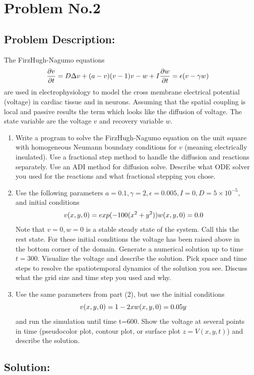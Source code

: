 \section{Problem No.2} \label{sec:prob2}
\subsection{Problem Description:} 
The FirzHugh-Nagumo equations 
$$
\frac{\partial v}{\partial t} = D\Delta v + (a-v)(v-1)v - w+I
\\
\frac{\partial w}{\partial t} = \epsilon (v-\gamma w)
$$
are used in electrophysiology to model the cross membrane electrical potential (voltage) in cardiac tissue and in neurons. Assuming that the spatial coupling is local and passive results the term which looks like the diffusion of voltage. The state variable are the voltage $v$ and recovery variable $w$.
\begin{enumerate}
\item Write a program to solve the FirzHugh-Nagumo equation on the unit square with homogeneous Neumann boundary conditions for $v$ (meaning electrically insulated). Use a fractional step method to handle the diffusion and reactions separately. Use an ADI method for diffusion solve. Describe what ODE solver you used for the reactions and what fractional stepping you chose. 
\item Use the following parameters $a=0.1, \gamma =2, \epsilon=0.005, I=0, D=5\times 10^{-5}$, and initial conditions 
$$
v(x,y,0)=exp(-100(x^{2}+y^{2}))
\\
w(x,y,0)=0.0
$$
Note that $v=0, w=0$ is a stable steady state of the system. Call this the rest state. For these initial conditions the voltage has been raised above in the bottom corner of the domain. Generate a numerical solution up to time $t=300$. Visualize the voltage and describe the solution. Pick space and time steps to resolve the spatiotemporal dynamics of the solution you see. Discuss what the grid size and time step you used and why. 
\item Use the same parameters from part (2), but use the initial conditions 
$$
v(x,y,0) = 1-2x
\\
w(x,y,0) = 0.05y
$$
and run the simulation until time t=600. Show the voltage at several points in time (pseudocolor plot, contour plot, or surface plot $z=V(x,y,t)$) and describe the solution. 
\end{enumerate}
\subsection{Solution:}
